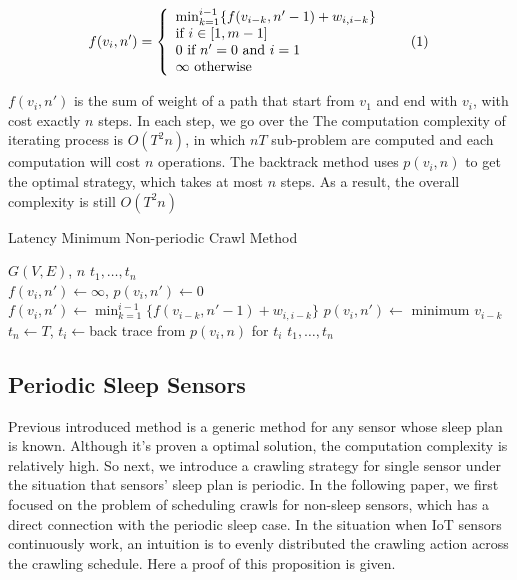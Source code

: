 \documentclass[conference]{IEEEtran}
\newcommand\numberthis{\addtocounter{equation}{1}\tag{\theequation}}
\begin{document}
\[f(v_i, n')=\left\{
\begin{array}{lr}
\min_{k=1}^{i-1}\{f(v_{i-k}, n'-1)+w_{i,i-k}\}\\
\text{if }i\in[1, m-1]\\
0\text{ if }n'=0\text{ and }i=1\\
\infty\text{ otherwise}
\end{array}\numberthis \label{dp}
\right.
\]


$f(v_i,n')$ is the sum of weight of a path that start from $v_1$ and end with $v_i$, with cost exactly $n$ steps. In each step, we go over the  The computation complexity of iterating process is $O(T^2n)$, in which $nT$ sub-problem are computed and each computation will cost $n$ operations. The backtrack method uses $p(v_i, n)$ to get the optimal strategy, which takes at most $n$ steps. As a result, the overall complexity is still $O(T^2n)$ 

\begin{algorithm}
	\caption{Latency Minimum Non-periodic Crawl Method}
	\label{alg:dp_min}
	\begin{algorithmic}[1]
		\renewcommand{\algorithmicrequire}{\textbf{Input:}}
		\renewcommand{\algorithmicensure}{\textbf{Output:}}
		\REQUIRE $G(V,E)$, $n$
		\ENSURE  $t_1,\ldots,t_n$
		\\
		\STATE $f(v_i,n') \gets \infty$, $p(v_i,n')\gets 0$
		\STATE $f(v_i,n')\gets\min_{k=1}^{i-1}\{f(v_{i-k}, n'-1)+w_{i,i-k}\}$
		\STATE $p(v_i,n')\gets$ minimum $v_{i-k}$
		\ENDFOR
		\ENDFOR
		\STATE $t_n\gets T$, $t_i\gets$back trace from $p(v_i, n)$ for $t_i$
		\RETURN $t_1,\ldots,t_n$
	\end{algorithmic}
\end{algorithm}


\subsection{Periodic Sleep Sensors}

Previous introduced method is a generic method for any sensor whose sleep plan is known. Although it's proven a optimal solution, the computation complexity is relatively high.
So next, we introduce a crawling strategy for single sensor under the situation that sensors' sleep plan is periodic.
In the following paper, we first focused on the problem of scheduling crawls for non-sleep sensors, which has a direct connection with the periodic sleep case.
In the situation when IoT sensors continuously work, an intuition is to evenly distributed the crawling action across the crawling schedule. Here a proof of this proposition is given.
\end{document}
